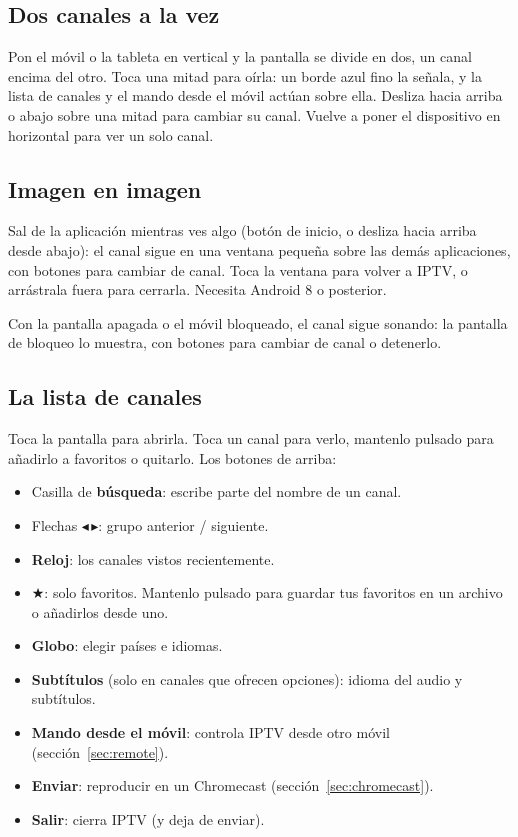 \subsection{Dos canales a la vez}
Pon el móvil o la tableta en vertical y la pantalla se divide en dos, un
canal encima del otro. Toca una mitad para oírla: un borde azul fino la
señala, y la lista de canales y el mando desde el móvil actúan sobre ella.
Desliza hacia arriba o abajo sobre una mitad para cambiar su canal. Vuelve a
poner el dispositivo en horizontal para ver un solo canal.

\subsection{Imagen en imagen}
Sal de la aplicación mientras ves algo (botón de inicio, o desliza hacia
arriba desde abajo): el canal sigue en una ventana pequeña sobre las demás
aplicaciones, con botones para cambiar de canal. Toca la ventana para volver a
IPTV, o arrástrala fuera para cerrarla. Necesita Android 8 o posterior.

Con la pantalla apagada o el móvil bloqueado, el canal sigue sonando: la
pantalla de bloqueo lo muestra, con botones para cambiar de canal o
detenerlo.

\subsection{La lista de canales}
Toca la pantalla para abrirla. Toca un canal para verlo, mantenlo pulsado
para añadirlo a favoritos o quitarlo. Los botones de arriba:
\begin{itemize}
  \item Casilla de \textbf{búsqueda}: escribe parte del nombre de un canal.
  \item Flechas $\blacktriangleleft$\,$\blacktriangleright$: grupo anterior /
        siguiente.
  \item \textbf{Reloj}: los canales vistos recientemente.
  \item $\bigstar$: solo favoritos. Mantenlo pulsado para guardar tus
        favoritos en un archivo o añadirlos desde uno.
  \item \textbf{Globo}: elegir países e idiomas.
  \item \textbf{Subtítulos} (solo en canales que ofrecen opciones): idioma
        del audio y subtítulos.
  \item \textbf{Mando desde el móvil}: controla IPTV desde otro móvil
        (sección~\ref{sec:remote}).
  \item \textbf{Enviar}: reproducir en un Chromecast
        (sección~\ref{sec:chromecast}).
  \item \textbf{Salir}: cierra IPTV (y deja de enviar).
\end{itemize}

